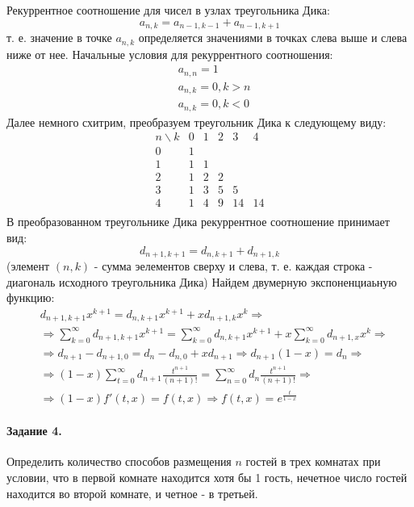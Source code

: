\documentclass[a4paper,12pt]{article}
\begin{document}
\begin{Solution}
Рекуррентное соотношение для чисел в узлах треугольника Дика:
\[
	a_{n,k} = a_{n-1, k-1} + a_{n-1,k+1}
\]
т. е. значение в точке $a_{n,k}$ определяется значениями в точках слева выше и слева ниже от нее.
Начальные условия для рекуррентного соотношения:
\[
	\begin{split}
		& a_{n,n} = 1 \\
		& a_{n,k} = 0, k > n \\
		& a_{n,k} = 0, k < 0
	\end{split}
\]
Далее немного схитрим, преобразуем треугольник Дика к следующему виду:
\[
	\begin{matrix}
		n \backslash k  & 0 & 1 & 2 & 3 & 4 \\
		0 & 1 \\
		1 & 1 & 1 \\
		2 & 1 & 2 & 2 \\
		3 & 1 & 3 & 5 & 5 \\
		4 & 1 & 4 & 9 & 14 & 14 \\
	\end{matrix}
\]
В преобразованном треугольнике Дика рекуррентное соотношение принимает вид:
\[
	d_{n+1,k+1} = d_{n, k+1} + d_{n+1, k}
\]
(элемент $(n,k)$ - сумма эелементов сверху и слева, т. е. каждая строка - диагональ исходного треугольника Дика)
Найдем двумерную экспоненциаьную функцию:
\[
	\begin{split}
		& d_{n+1, k+1} x^{k+1} = d_{n, k+1} x^{k+1} + x d_{n+1, k} x^k \Rightarrow \\
		& \Rightarrow \sum_{k=0}^{\infty} d_{n+1, k+1} x^{k+1} = \sum_{k=0}^{\infty} d_{n, k+1} x^{k+1} + x \sum_{k=0}^{\infty} d_{n+1, x} x^k \Rightarrow \\
		& \Rightarrow d_{n+1} - d_{n+1, 0} = d_{n} - d_{n, 0} + x d_{n+1} \Rightarrow d_{n+1} \left(1 - x\right) = d_{n} \Rightarrow \\
		& \Rightarrow \left(1 - x\right) \sum_{t = 0}^{\infty} d_{n+1} \frac{t^{n+1}}{\left(n+1\right)!} = \sum_{n=0}^{\infty} d_{n} \frac{t^{n+1}}{\left(n+1\right)!} \Rightarrow \\
		& \Rightarrow \left(1 - x\right)f'\left(t,x\right) = f\left(t,x\right) \Rightarrow f\left(t,x\right) = e^{\frac{t}{1-x}}
	\end{split}
\]
\end{Solution}

\paragraph{Задание 4.} Определить количество способов размещения $n$ гостей в трех комнатах при условии, что в первой комнате находится хотя бы 1 гость, нечетное число гостей находится во второй комнате, и четное - в третьей.
\end{document}
